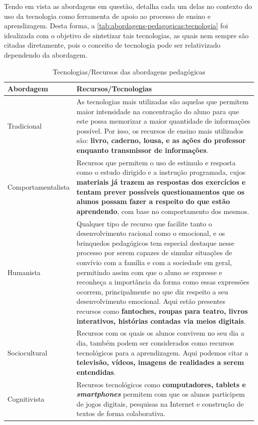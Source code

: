 Tendo em vista as abordagens em questão,  detalha cada um delas no contexto do uso da tecnologia como ferramenta de apoio ao processo de ensino e aprendizagem. Desta forma, a \autoref{tab:abordagens-pedagogicas:tecnologia} foi idealizada com o objetivo de sintetizar tais tecnologias, as quais nem sempre são citadas diretamente, pois o conceito de tecnologia pode ser relativizado dependendo da abordagem.

\begin{table}[htbp]
\caption{Tecnologias/Recursos das abordagens pedagógicas}
\label{tab:abordagens-pedagogicas:tecnologia}
\begin{tabularx}{\textwidth}{p{3.5cm}|X} \hline
\textbf{Abordagem} & \textbf{Recursos/Tecnologias} \\ \hline
Tradicional & As tecnologias mais utilizadas são aquelas que permitem maior intensidade na concentração do aluno para que este possa memorizar a maior quantidade de informações possível. Por isso, os recursos de ensino mais utilizados são: \textbf{livro, caderno, lousa, e as ações do professor enquanto transmissor de informações}. \\ \hline
Comportamentalista & Recursos que permitem o uso de estimulo e resposta como o estudo dirigido e a instrução programada, cujos \textbf{materiais já trazem as respostas dos exercícios e tentam prever possíveis questionamentos que os alunos possam fazer a respeito do que estão aprendendo}, com base no comportamento dos mesmos. \\ \hline
Humanista & Qualquer tipo de recurso que facilite tanto o desenvolvimento racional como o emocional, e os brinquedos pedagógicos tem especial destaque nesse processo por serem capazes de simular situações de convívio com a família e com a sociedade em geral, permitindo assim com que o aluno se expresse e reconheça a importância da forma como essas expressões ocorrem, principalmente no que diz respeito a seu desenvolvimento emocional. Aqui estão presentes recursos como \textbf{fantoches, roupas para teatro, livros interativos, histórias contadas via meios digitais}. \\ \hline
Sociocultural & Recursos com os quais os alunos convivem no seu dia a dia, também podem ser considerados como recursos tecnológicos para a aprendizagem. Aqui podemos citar a \textbf{televisão, vídeos, imagens de realidades a serem entendidas}. \\ \hline
Cognitivista & Recursos tecnológicos como \textbf{computadores, tablets e \textit{smartphones}} permitem com que os alunos participem de jogos digitais, pesquisas na Internet e construção de textos de forma colaborativa. \\ \hline

\end{tabularx}
\end{table}
